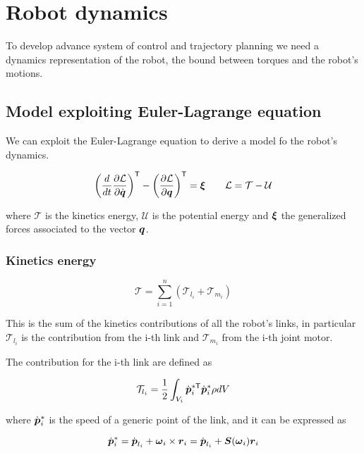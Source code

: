 \chapter{Robot dynamics}\label{ch:dynamics}

To develop advance system of control and trajectory planning we need a dynamics representation of the robot, the bound between torques and the robot's motions.

\section{Model exploiting Euler-Lagrange equation}

We can exploit the Euler-Lagrange equation to derive a model fo the robot's dynamics.

\[
	\left(\frac{d}{dt}\frac{\partial \mathcal{L}}{\partial \dot{\boldsymbol{q}}}\right)^{\mathsf{T}} - \left(\frac{\partial \mathcal{L}}{\partial \boldsymbol{q}}\right)^{\mathsf{T}} = \boldsymbol{\xi} \qquad
	\mathcal{L} = \mathcal{T} - \mathcal{U}
\]

where $\mathcal{T}$ is the kinetics energy, $\mathcal{U}$ is the potential energy and $\boldsymbol{\xi}$ the generalized forces associated to the vector $\boldsymbol{q}$.

\subsection{Kinetics energy}

\[ \mathcal{T} = \sum_{i=1}^n (\mathcal{T}_{l_i} + \mathcal{T}_{m_i}) \]

This is the sum of the kinetics contributions of all the robot's links, in particular $\mathcal{T}_{l_i}$ is the contribution from the i-th link and $\mathcal{T}_{m_i}$ from the i-th joint motor.

The contribution for the i-th link are defined as

\begin{equation}
    \mathcal{T}_{l_i} = \frac{1}{2} \int_{V_i}  \dot{\boldsymbol{p}}_i^{*\mathsf{T}} \dot{\boldsymbol{p}}_i^* \rho dV \label{eq:link_kinetic}
\end{equation}

where $\dot{\boldsymbol{p}}_i^*$ is the speed of a generic point of the link, and it can be expressed as

\begin{equation}
    \dot{\boldsymbol{p}}_i^* = \dot{\boldsymbol{p}}_{l_i} + \boldsymbol{\omega}_i \times \boldsymbol{r}_i = \dot{\boldsymbol{p}}_{l_i} + \boldsymbol{S}(\boldsymbol{\omega}_i) \boldsymbol{r}_i \label{eq:generic_link_point_speed}
\end{equation}

